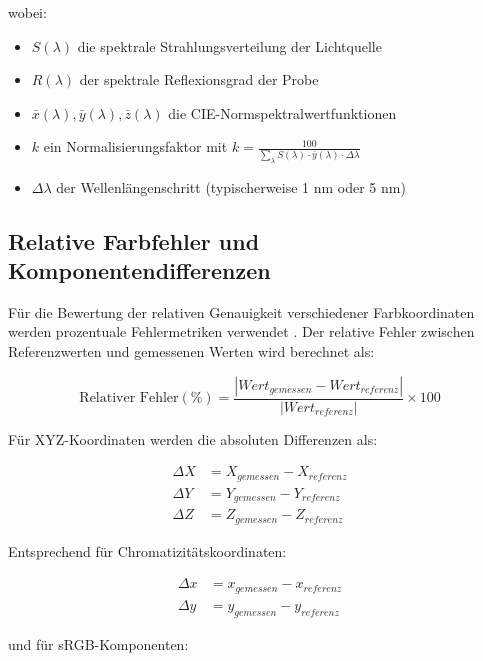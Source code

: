 wobei:
\begin{itemize}
    \item $S(\lambda)$ die spektrale Strahlungsverteilung der Lichtquelle
    \item $R(\lambda)$ der spektrale Reflexionsgrad der Probe
    \item $\bar{x}(\lambda), \bar{y}(\lambda), \bar{z}(\lambda)$ die CIE-Normspektralwertfunktionen
    \item $k$ ein Normalisierungsfaktor mit $k = \frac{100}{\sum_{\lambda} S(\lambda) \cdot \bar{y}(\lambda) \cdot \Delta\lambda}$
    \item $\Delta\lambda$ der Wellenlängenschritt (typischerweise 1 nm oder 5 nm)
\end{itemize}

\subsection{Relative Farbfehler und Komponentendifferenzen}

Für die Bewertung der relativen Genauigkeit verschiedener Farbkoordinaten werden prozentuale Fehlermetriken verwendet \parencite{Fairchild2013}. Der relative Fehler zwischen Referenzwerten und gemessenen Werten wird berechnet als:

\begin{equation}
\text{Relativer Fehler}(\%) = \frac{|Wert_{gemessen} - Wert_{referenz}|}{|Wert_{referenz}|} \times 100
\label{eq:relative_error}
\end{equation}

Für XYZ-Koordinaten werden die absoluten Differenzen als:

\begin{align}
\Delta X &= X_{gemessen} - X_{referenz} \label{eq:delta_x}\\
\Delta Y &= Y_{gemessen} - Y_{referenz} \label{eq:delta_y}\\
\Delta Z &= Z_{gemessen} - Z_{referenz} \label{eq:delta_z}
\end{align}

Entsprechend für Chromatizitätskoordinaten:

\begin{align}
\Delta x &= x_{gemessen} - x_{referenz} \label{eq:delta_chrom_x}\\
\Delta y &= y_{gemessen} - y_{referenz} \label{eq:delta_chrom_y}
\end{align}

und für sRGB-Komponenten:


